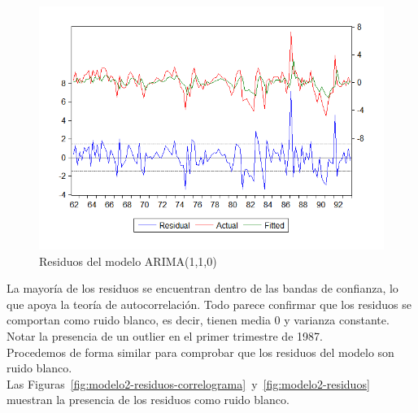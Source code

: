 \documentclass[12pt,a4paper,twoside,openright,titlepage,final]{article}
\begin{document}
\begin{figure}[tbph!]
	\centering
	\includegraphics[width=0.7\linewidth]{imagenes/empleo/modelo1-residuos.png}
	\caption{Residuos del modelo ARIMA(1,1,0)}
	\label{fig:modelo1-residuos}
\end{figure}

La mayoría de los residuos se encuentran dentro de las bandas de confianza, lo que apoya la teoría de autocorrelación. Todo parece confirmar que los residuos se comportan como ruido blanco, es decir, tienen media 0 y varianza constante.\\

Notar la presencia de un outlier en el primer trimestre de 1987.\\

Procedemos de forma similar para comprobar que los residuos del modelo son ruido blanco.\\

Las Figuras~\ref{fig:modelo2-residuos-correlograma}~y~\ref{fig:modelo2-residuos} muestran la presencia de los residuos como ruido blanco.\\ 
 
\end{document}
